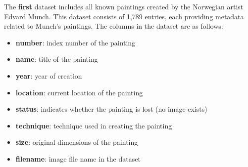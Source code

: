 \documentclass[a4paper,12pt]{article}
\begin{document}
The \textbf{first} dataset includes all known paintings created by the Norwegian artist Edvard Munch. This dataset consists of 1,789 entries, each providing metadata related to Munch's paintings. The columns in the dataset are as follows:


\begin{itemize}
      \item \textbf{number}: index number of the painting
      \item \textbf{name}: title of the painting
      \item \textbf{year}: year of creation
      \item \textbf{location}: current location of the painting
      \item \textbf{status}: indicates whether the painting is lost (no image exists)
      \item \textbf{technique}: technique used in creating the painting
      \item \textbf{size}: original dimensions of the painting
      \item \textbf{filename}: image file name in the dataset
\end{itemize}
\end{document}

